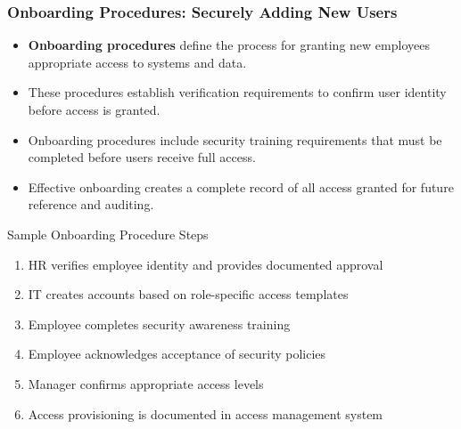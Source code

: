 \documentclass{beamer}
\begin{document}
\begin{frame}
\frametitle{Onboarding Procedures: Securely Adding New Users}
\begin{itemize}
\item \textbf{Onboarding procedures} define the process for granting new employees appropriate access to systems and data.
\item These procedures establish verification requirements to confirm user identity before access is granted.
\item Onboarding procedures include security training requirements that must be completed before users receive full access.
\item Effective onboarding creates a complete record of all access granted for future reference and auditing.
\end{itemize}

\begin{exampleblock}{Sample Onboarding Procedure Steps}
\scriptsize
\begin{enumerate}
\item HR verifies employee identity and provides documented approval
\item IT creates accounts based on role-specific access templates
\item Employee completes security awareness training
\item Employee acknowledges acceptance of security policies
\item Manager confirms appropriate access levels
\item Access provisioning is documented in access management system
\end{enumerate}
\end{exampleblock}
\end{frame}
\end{document}

